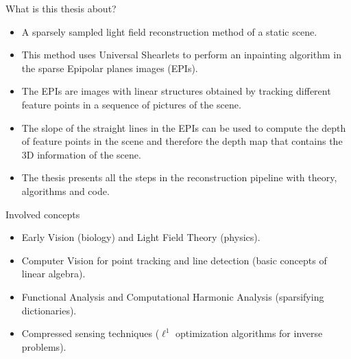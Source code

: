 \begin{frame}{What is this thesis about?}
\begin{block}{}
\begin{itemize}
\item A sparsely sampled light field reconstruction method of a static scene. 

\bigskip
\pause
\item This method uses Universal Shearlets to perform an inpainting algorithm in the sparse Epipolar planes images (EPIs).

\bigskip 
\pause
\item The EPIs are images with linear structures obtained by tracking different feature points in a sequence of pictures of the scene. 

\bigskip
\pause
\item The slope of the straight lines in the EPIs can be used to compute the depth of feature points in the scene and therefore the depth map that contains the 3D information of the scene.

\bigskip
\pause
\item The thesis presents all the steps in the reconstruction pipeline with theory, algorithms and code. 
\end{itemize} 
\end{block}
\end{frame}

\begin{frame}{Involved concepts}
\begin{block}{}
\begin{itemize}
\item Early Vision (biology) and Light Field Theory (physics).

\bigskip
\pause
\item Computer Vision for point tracking and line detection (basic concepts of linear algebra).

\bigskip 
\pause
\item Functional Analysis and Computational Harmonic Analysis (sparsifying dictionaries).

\bigskip
\pause
\item Compressed sensing techniques ($\ell^1$ optimization algorithms for inverse problems). 
\end{itemize}
\end{block}
\end{frame}

